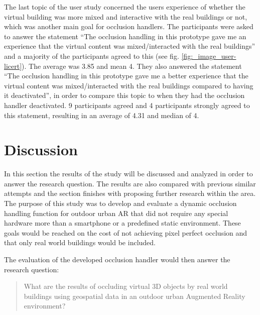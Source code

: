 The last topic of the user study concerned the users experience of whether the virtual building was more mixed and interactive with the real buildings or not, which was another main goal for occlusion handlers. The participants were asked to answer the statement ``The occlusion handling in this prototype gave me an experience that the virtual content was mixed/interacted with the real buildings'' and a majority of the participants agreed to this (see fig. \ref{fig:_image_user-licert}). The average was 3.85 and mean 4. They also answered the statement ``The occlusion handling in this prototype gave me a better experience that the virtual content was mixed/interacted with the real buildings compared to having it deactivated'', in order to compare this topic to when they had the occlusion handler deactivated. 9 participants agreed and 4 participants strongly agreed to this statement, resulting in an average of 4.31 and median of 4.

\section{Discussion}
In this section the results of the study will be discussed and analyzed in order to answer the research question. The results are also  compared with previous similar attempts and the section finishes with proposing further research within the area. 
The purpose of this study was to develop and evaluate a dynamic occlusion handling function for outdoor urban AR that did not require any special hardware more than a smartphone or a predefined static environment. These goals would be reached on the cost of not achieving pixel perfect occlusion and that only real world buildings would be included. 

The evaluation of the developed occlusion handler would then answer the research question:
\begin{quote}
What are the results of occluding virtual 3D objects by real world buildings using geospatial data in an outdoor urban Augmented Reality environment?
\end{quote}

